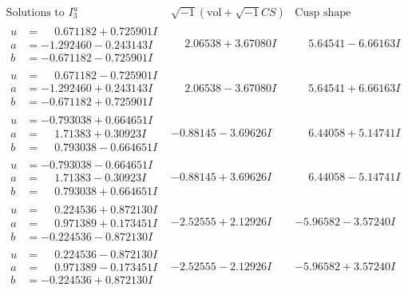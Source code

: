 \documentclass[1p]{elsarticle_modified}
\theoremstyle{definition}
\newcommand{\I}{\sqrt{-1}}
\begin{document}
$$\begin{array}{c|c|c}  
\text{Solutions to }I^u_{3}& \I (\text{vol} + \sqrt{-1}CS) & \text{Cusp shape}\\
 \hline 
\begin{aligned}
u &= \phantom{-}0.671182 + 0.725901 I \\
a &= -1.292460 - 0.243143 I \\
b &= -0.671182 - 0.725901 I\end{aligned}
 & \phantom{-}2.06538 + 3.67080 I & \phantom{-}5.64541 - 6.66163 I \\ \hline\begin{aligned}
u &= \phantom{-}0.671182 - 0.725901 I \\
a &= -1.292460 + 0.243143 I \\
b &= -0.671182 + 0.725901 I\end{aligned}
 & \phantom{-}2.06538 - 3.67080 I & \phantom{-}5.64541 + 6.66163 I \\ \hline\begin{aligned}
u &= -0.793038 + 0.664651 I \\
a &= \phantom{-}1.71383 + 0.30923 I \\
b &= \phantom{-}0.793038 - 0.664651 I\end{aligned}
 & -0.88145 - 3.69626 I & \phantom{-}6.44058 + 5.14741 I \\ \hline\begin{aligned}
u &= -0.793038 - 0.664651 I \\
a &= \phantom{-}1.71383 - 0.30923 I \\
b &= \phantom{-}0.793038 + 0.664651 I\end{aligned}
 & -0.88145 + 3.69626 I & \phantom{-}6.44058 - 5.14741 I \\ \hline\begin{aligned}
u &= \phantom{-}0.224536 + 0.872130 I \\
a &= \phantom{-}0.971389 + 0.173451 I \\
b &= -0.224536 - 0.872130 I\end{aligned}
 & -2.52555 + 2.12926 I & -5.96582 - 3.57240 I \\ \hline\begin{aligned}
u &= \phantom{-}0.224536 - 0.872130 I \\
a &= \phantom{-}0.971389 - 0.173451 I \\
b &= -0.224536 + 0.872130 I\end{aligned}
 & -2.52555 - 2.12926 I & -5.96582 + 3.57240 I \\ \hline\begin{aligned}

\end{aligned}
\end{array}$$
\end{document}
